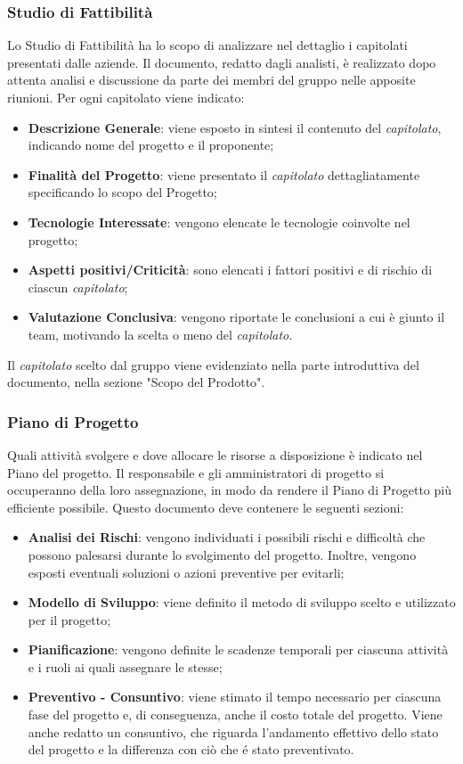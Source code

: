 \subsubsection{Studio di Fattibilità}
Lo Studio di Fattibilità ha lo scopo di analizzare nel dettaglio i capitolati presentati dalle aziende. Il documento,  redatto dagli analisti, è realizzato dopo attenta analisi e discussione da parte dei membri del gruppo nelle apposite riunioni. Per ogni capitolato viene indicato:
\begin{itemize}
  \item \textbf{Descrizione Generale}: viene esposto in sintesi il contenuto del \textit{capitolato\glos}, indicando nome del progetto e il proponente;
  \item \textbf{Finalità del Progetto}: viene presentato il \textit{capitolato\glo} dettagliatamente specificando lo scopo del Progetto;
  \item \textbf{Tecnologie Interessate}: vengono elencate le tecnologie coinvolte nel progetto;
  \item \textbf{Aspetti positivi/Criticità}: sono elencati i fattori positivi e di rischio di ciascun \textit{capitolato\glos};
  \item \textbf{Valutazione Conclusiva}: vengono riportate le conclusioni a cui è giunto il team, motivando la scelta o meno del \textit{capitolato\glos}.
\end{itemize}
Il \textit{capitolato\glo} scelto dal gruppo viene evidenziato nella parte introduttiva del documento, nella sezione "Scopo del Prodotto".
\subsubsection{Piano di Progetto}
Quali attività svolgere e dove allocare le risorse a disposizione è indicato nel Piano del progetto. Il responsabile e gli amministratori di progetto si occuperanno della loro assegnazione, in modo da rendere il Piano di Progetto più efficiente possibile. Questo documento deve contenere le seguenti sezioni:
\begin{itemize}
  \item \textbf{Analisi dei Rischi}: vengono individuati i possibili rischi e difficoltà che possono palesarsi durante lo svolgimento del progetto. Inoltre, vengono esposti eventuali soluzioni o azioni preventive per evitarli;
  \item \textbf{Modello di Sviluppo}: viene definito il metodo di sviluppo scelto e utilizzato per il progetto;
  \item \textbf{Pianificazione}: vengono definite le scadenze temporali per ciascuna attività e i ruoli ai quali assegnare le stesse;
  \item \textbf{Preventivo - Consuntivo}: viene stimato il tempo necessario per ciascuna fase del progetto e, di conseguenza, anche il costo totale del progetto. Viene anche redatto un consuntivo, che riguarda l'andamento effettivo dello stato del progetto e la differenza con ciò che é stato preventivato.
\end{itemize}
